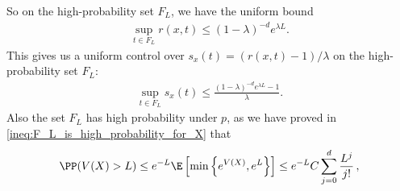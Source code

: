 So on the high-probability set $F_L$, we have the uniform bound
\begin{align}
    \sup_{t \in F_L} r(x, t) \leq (1 - \lambda)^{-d} e^{\lambda L}.
\end{align}
This gives us a uniform control over $s_x(t) = (r(x, t) - 1)/\lambda$ on the high-probability set $F_L$:
\begin{align}
    \sup_{t \in F_L} s_x(t) \leq \frac{(1 - \lambda)^{-d} e^{\lambda L} - 1}{\lambda}.
\end{align}
Also the set $F_L$ has high probability under $p$, as we have proved in \cref{ineq:F_L_is_high_probability_for_X} that
\begin{align}
    \PP(V(X)>L)
    \le
    e^{-L}
    \E\left[
        \min\left\{e^{V(X)},e^L\right\}
        \right]
    \le
    e^{-L}
    C
    \sum_{j=0}^d \frac{L^j}{j!}\,,
\end{align}